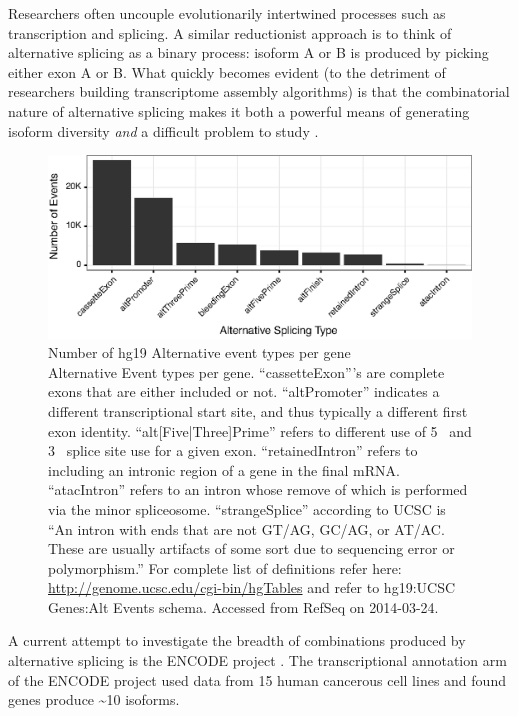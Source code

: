    Researchers often uncouple evolutionarily intertwined processes such as transcription and splicing. A similar reductionist approach is to think of alternative splicing as a binary process: isoform A or B is produced by picking either exon A or B. What quickly becomes evident (to the detriment of researchers building transcriptome assembly algorithms) is that the combinatorial nature of alternative splicing makes it both a powerful means of generating isoform diversity \textit{and} a difficult problem to study \citep{Trapnell2012a}.

    \begin{figure} %
      \centering
      \includegraphics{Figures/Intro/ASEventTypesPlot.eps}
      \caption[Number of hg19 Alternative Event types]
      {
        Number of hg19 Alternative event types per gene\\[0.25cm]
        Alternative Event types per gene. ``cassetteExon'''s are complete exons that are either included or not. ``altPromoter'' indicates a different transcriptional start site, and thus typically a different first exon identity. ``alt[Five|Three]Prime'' refers to different use of 5\textprime~ and 3\textprime~ splice site use for a given exon. ``retainedIntron'' refers to including an intronic region of a gene in the final mRNA. ``atacIntron'' refers to an intron whose remove of which is performed via the minor spliceosome. ``strangeSplice'' according to UCSC is ``An intron with ends that are not GT/AG, GC/AG, or AT/AC. These are usually artifacts of some sort due to sequencing error or polymorphism.'' For complete list of definitions refer here: \url{http://genome.ucsc.edu/cgi-bin/hgTables} and refer to hg19:UCSC Genes:Alt Events schema. Accessed from RefSeq on 2014-03-24.
        }
      \label{Intro:fig:asEventsBarChart}
      \end{figure}

    A current attempt to investigate the breadth of combinations produced by alternative splicing is the ENCODE project \citep{Birney2007,Dunham2012}. The transcriptional annotation arm of the ENCODE project \citep{Djebali2012,Derrien2012} used data from 15 human cancerous cell lines and found genes produce \textasciitilde10 isoforms.

